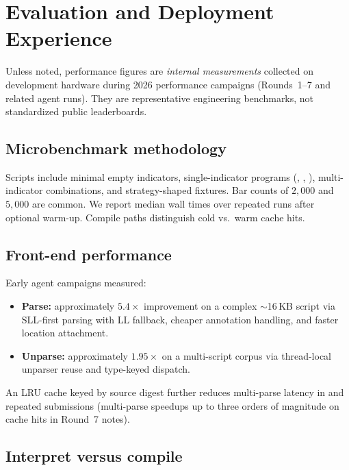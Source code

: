 \documentclass[11pt,a4paper]{article}
\begin{document}
\section{Evaluation and Deployment Experience}
\label{sec:eval}

Unless noted, performance figures are \emph{internal measurements} collected
on development hardware during 2026 performance campaigns (Rounds~1--7 and
related agent runs).
They are representative engineering benchmarks, not standardized public
leaderboards.

\subsection{Microbenchmark methodology}
\label{sec:method}

Scripts include minimal empty indicators, single-indicator programs
(, , ), multi-indicator combinations,
and strategy-shaped fixtures.
Bar counts of $2{,}000$ and $5{,}000$ are common.
We report median wall times over repeated runs after optional warm-up.
Compile paths distinguish cold \jit{} vs.\ warm cache hits.

\subsection{Front-end performance}
\label{sec:perf-fe}

Early agent campaigns measured:

\begin{itemize}[leftmargin=1.2em]
  \item \textbf{Parse:} approximately $5.4\times$ improvement on a complex
    $\sim$16\,KB script via SLL-first parsing with LL fallback, cheaper
    annotation handling, and faster location attachment.
  \item \textbf{Unparse:} approximately $1.95\times$ on a multi-script corpus
    via thread-local unparser reuse and type-keyed dispatch.
\end{itemize}

An \ast{} LRU cache keyed by source digest further reduces multi-parse latency
in \lsp{} and repeated \api{} submissions (multi-parse speedups up to three
orders of magnitude on cache hits in Round~7 notes).

\subsection{Interpret versus compile}
\label{sec:perf-engines}
\end{document}
